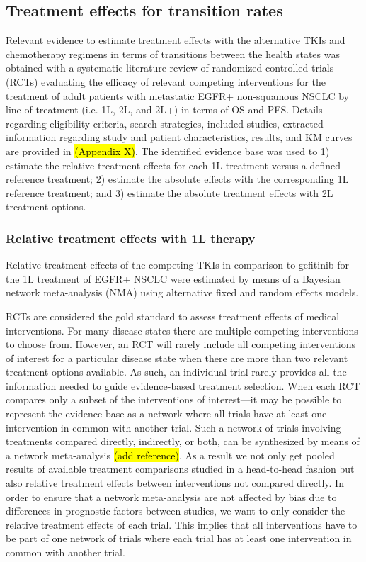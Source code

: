 \documentclass[11pt,final,fleqn]{article}\usepackage[]{graphicx}\usepackage[]{color}
\theoremstyle{plain}
\begin{document}
{\subsection{Treatment effects for transition rates} \label{subsec:data-transprobs}
Relevant evidence to estimate treatment effects with the alternative TKIs and chemotherapy regimens in terms of transitions between the health states was obtained with a systematic literature review of randomized controlled trials (RCTs) evaluating the efficacy of relevant competing interventions for the treatment of adult patients with metastatic EGFR+ non-squamous NSCLC by line of treatment (i.e. 1L, 2L, and 2L+) in terms of OS and PFS. Details regarding eligibility criteria, search strategies, included studies, extracted information regarding study and patient characteristics, results, and KM curves are provided in \hl{(Appendix X)}. 
The identified evidence base was used to 1) estimate the relative treatment effects for each 1L treatment versus a defined reference treatment; 2) estimate the absolute effects with the corresponding 1L reference treatment; and 3) estimate the absolute treatment effects with 2L treatment options. 

\subsubsection{Relative treatment effects with 1L therapy}
Relative treatment effects of the competing TKIs in comparison to gefitinib for the 1L treatment of EGFR+ NSCLC were estimated by means of a Bayesian network meta-analysis (NMA) using alternative fixed and random effects models. 

RCTs are considered the gold standard to assess treatment effects of medical interventions. For many disease states there are multiple competing interventions to choose from. However, an RCT will rarely include all competing interventions of interest for a particular disease state when there are more than two relevant treatment options available. As such, an individual trial rarely provides all the information needed to guide evidence-based treatment selection. When each RCT compares only a subset of the interventions of interest---it may be possible to represent the evidence base as a network where all trials have at least one intervention in common with another trial. Such a network of trials involving treatments compared directly, indirectly, or both, can be synthesized by means of a network meta-analysis \hl{(add reference)}. As a result we not only get pooled results of available treatment comparisons studied in a head-to-head fashion but also relative treatment effects between interventions not compared directly. In order to ensure that a network meta-analysis are not affected by bias due to differences in prognostic factors between studies, we want to only consider the relative treatment effects of each trial. This implies that all interventions have to be part of one network of trials where each trial has at least one intervention in common with another trial.  

}
\end{document}
